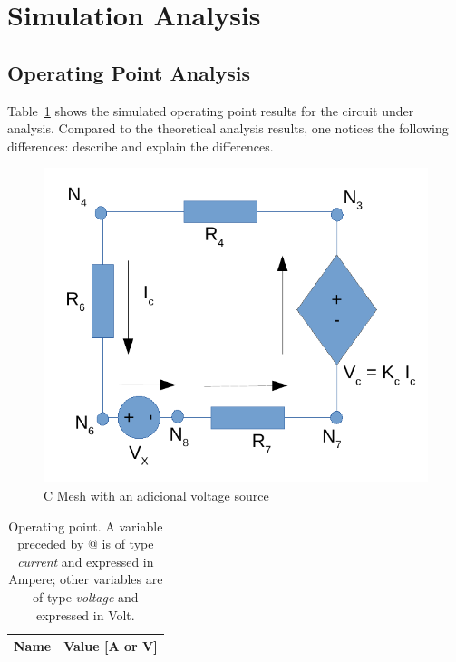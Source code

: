 \section{Simulation Analysis}
\label{sec:simulation}

\subsection{Operating Point Analysis}

Table~\ref{tab:op} shows the simulated operating point results for the circuit
under analysis. Compared to the theoretical analysis results, one notices the
following differences: describe and explain the differences.


\begin{figure}[h] \centering
\includegraphics[width=0.4\linewidth]{malhaC.pdf}
\caption{C Mesh with an adicional voltage source} %
\label{fig:malhaC}
\end{figure}

\begin{table}[h]
  \centering
  \begin{tabular}{|l|r|}
    \hline    
    {\bf Name} & {\bf Value [A or V]} \\ \hline
    
  \end{tabular}
  \caption{Operating point. A variable preceded by @ is of type {\em current}
    and expressed in Ampere; other variables are of type {\it voltage} and expressed in
    Volt.}
  \label{tab:op}
\end{table}

\lipsum[1-1]



